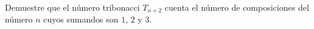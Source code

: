 Demuestre que el número tribonacci \(T_{n+2}\) cuenta el número de composiciones del número \(n\) cuyos sumandos son \(1\), \(2\) y \(3\).
